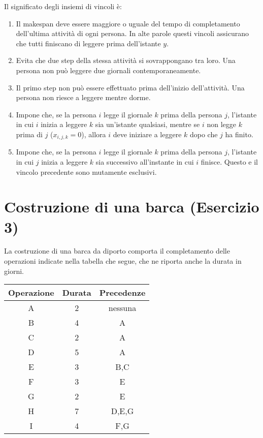 \noindent Il significato degli insiemi di vincoli è:
\begin{enumerate}[(1)]
	\item Il makespan deve essere maggiore o uguale del tempo di completamento dell'ultima attività di ogni persona. In alte parole questi vincoli assicurano che tutti finiscano di leggere prima dell'istante $y$.
	\item Evita che due step della stessa attività si sovrappongano tra loro. Una persona non può leggere due giornali contemporaneamente.
	\item Il primo step non può essere effettuato prima dell'inizio dell'attività. Una persona non riesce a leggere mentre dorme.
	\item Impone che, se la persona $i$ legge il giornale $k$ prima della persona $j$, l'istante in cui $i$ inizia a leggere $k$ sia un'istante qualsiasi, mentre se $i$ non legge $k$ prima di $j$ ($x_{i,j,k}=0$), allora $i$ deve iniziare a leggere $k$ dopo che $j$ ha finito.
	\item Impone che, se la persona $i$ legge il giornale $k$ prima della persona $j$, l'istante in cui $j$ inizia a leggere $k$ sia successivo all'instante in cui $i$ finisce. Questo e il vincolo precedente sono mutamente esclusivi.
\end{enumerate}

\section{Costruzione di una barca (Esercizio 3)}

La costruzione di una barca da diporto comporta il completamento delle operazioni indicate nella tabella che segue, che ne riporta anche la durata in giorni.

\begin{table}[htbp]
	\centering
	\begin{tabular}{ccc}
		\textbf{Operazione} & \textbf{Durata} & \textbf{Precedenze} \\ \hline
		A                   & 2               & nessuna             \\ 
		B                   & 4               & A                   \\ 
		C                   & 2               & A                   \\ 
		D                   & 5               & A                   \\ 
		E                   & 3               & B,C                 \\ 
		F                   & 3               & E                   \\ 
		G                   & 2               & E                   \\ 
		H                   & 7               & D,E,G               \\ 
		I                   & 4               & F,G                 \\ 
	\end{tabular}
\end{table}


